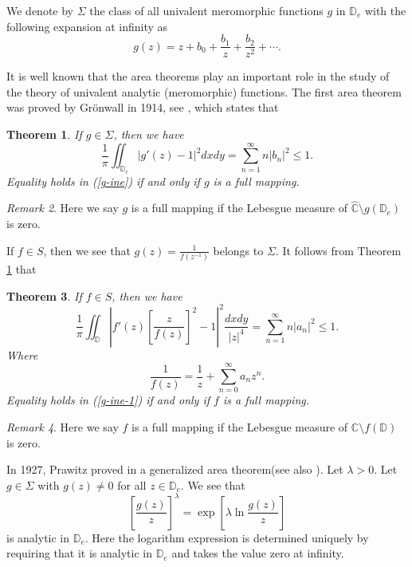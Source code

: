 \documentclass[10pt]{amsart}
\newtheorem{theorem}{Theorem}[section]
\theoremstyle{definition}
\theoremstyle{remark}
\newtheorem{remark}[theorem]{Remark}
\numberwithin{equation}{section}
\begin{document}
We denote by $\Sigma$ the class of all univalent meromorphic functions $g$ in  $\mathbb{D}_e$ with the following expansion
at infinity as
$$g(z)=z+b_0+\frac{b_1}{z}+\frac{b_2}{z^2}+\cdots. $$

It is well known that the area theorems play an important role in the study of the theory of univalent analytic (meromorphic) functions. The first area theorem was proved by Gr\"onwall in 1914, see \cite[page 18]{Po}, which states that
\begin{theorem}\label{g-1}If $g\in \Sigma$, then we have 
\begin{equation}\label{g-ine}
\frac{1}{\pi}\iint_{\mathbb{D}_e}|g'(z)-1|^2dxdy=\sum_{n=1}^{\infty}n|b_n|^2 \leq 1.
\end{equation}
Equality holds in (\ref{g-ine}) if and only if $g$ is a full mapping.
\end{theorem}
\begin{remark}
Here we say $g$ is a full mapping if the Lebesgue measure of $\widehat{\mathbb{C}}\setminus g(\mathbb{D}_e)$ is zero. 
\end{remark}

If $f\in S$, then we see that $g(z)=\frac{1}{f(z^{-1})}$ belongs to $\Sigma$. It follows from Theorem \ref{g-1} that
\begin{theorem}\label{g-2}If $f\in S$, then we have 
\begin{equation}\label{g-ine-1}
\frac{1}{\pi}\iint_{\mathbb{D}}\left|f'(z)\left[\frac{z}{f(z)}\right]^{2}-1\right|^2\frac{dxdy}{|z|^{4}}=\sum_{n=1}^{\infty}n|a_n|^2\leq 1. 
\end{equation}
Where $$\frac{1}{f(z)}=\frac{1}{z}+\sum_{n=0}^{\infty}a_nz^n.$$
Equality holds in (\ref{g-ine-1}) if and only if $f$ is a full mapping.
\end{theorem}
\begin{remark}
Here we say $f$ is a full mapping if the Lebesgue measure of $\mathbb{C}\setminus f(\mathbb{D})$ is zero.
\end{remark}

In 1927, Prawitz proved  in \cite{Pra} a generalized area theorem(see also \cite[page 13]{Mi}).  Let $\lambda>0$. Let $g\in \Sigma$ with $g(z)\neq0$ for all $z\in \mathbb{D}_e$. We see that
\begin{equation}
\left[\frac{g(z)}{z}\right]^{\lambda}=\exp\left[\lambda \ln\frac{g(z)}{z}\right]\nonumber 
\end{equation}
is  analytic in $\mathbb{D}_e$. Here the logarithm expression is determined uniquely by requiring that it is analytic in $\mathbb{D}_e$ and takes the value zero at infinity.  
\end{document}
